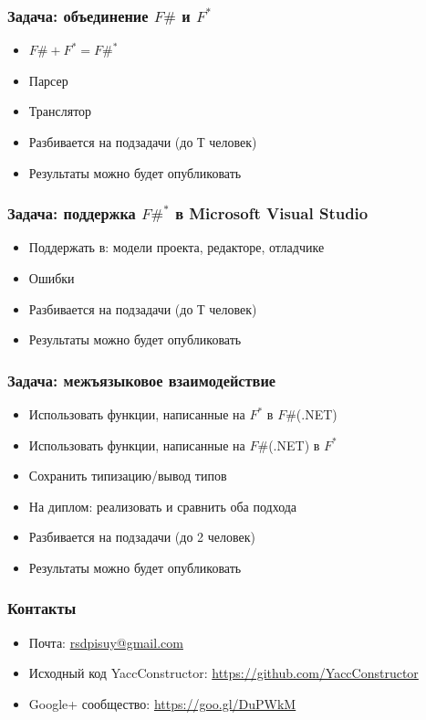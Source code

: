\documentclass{beamer}
\begin{document}
\begin{frame}
  \transwipe[direction=90]
  \frametitle{Задача: объединение $F\#$ и $F^*$}
  \begin{itemize}
    \item $F\# + F^* = F\#^*$
    \item Парсер
    \item Транслятор
    \item Разбивается на подзадачи (до Т человек)
    \item Результаты можно будет опубликовать
  \end{itemize}
\end{frame}

\begin{frame}
  \transwipe[direction=90]
  \frametitle{Задача: поддержка $F\#^*$ в Microsoft Visual Studio}
  \begin{itemize}
    \item Поддержать в: модели проекта, редакторе, отладчике
    \item Ошибки
    \item Разбивается на подзадачи (до Т человек)
    \item Результаты можно будет опубликовать
  \end{itemize}
\end{frame}

\begin{frame}
  \transwipe[direction=90]
  \frametitle{Задача: межъязыковое взаимодействие}
  \begin{itemize}
    \item Использовать функции, написанные на $F^*$ в $F\#$(.NET)
    \item Использовать функции, написанные на $F\#$(.NET) в $F^*$
    \item Сохранить типизацию/вывод типов
    \item На диплом: реализовать и сравнить оба подхода
    \item Разбивается на подзадачи (до 2 человек)
    \item Результаты можно будет опубликовать
  \end{itemize}
\end{frame}


            
\begin{frame}
\transwipe[direction=90]
\frametitle{Контакты}
\begin{itemize}
  \item Почта: \url{rsdpisuy@gmail.com}
  \item Исходный код YaccConstructor: \url{https://github.com/YaccConstructor}
  \item Google+ сообщество: \url{https://goo.gl/DuPWkM}
\end{itemize}
\end{frame}
\end{document}
